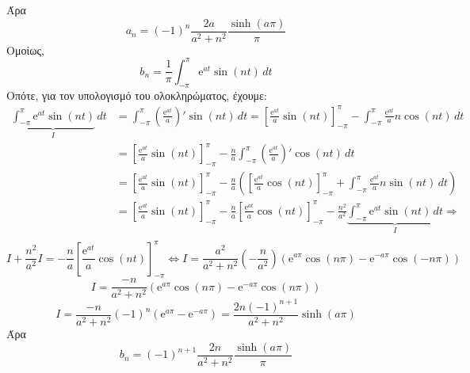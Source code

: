 \begin{solution}
\[  \] 
  Άρα 
  \[
    a_{n} = (-1)^{n}\frac{2a}{a^{2}+n^{2}} \frac{\sinh{(a \pi)}}{\pi}
  \] 
  Ομοίως, 
  \[
    b_{n} = \frac{1}{\pi} \int_{-\pi}^{\pi} \mathrm{e}^{at} \sin{(nt)} \,{dt}
  \]
  Οπότε, για τον υπολογισμό του ολοκληρώματος, έχουμε:
  \begin{align*}
    \underbrace{\int_{-\pi}^{\pi} \mathrm{e}^{at} \sin{(nt)}}_{I} \,{dt} 
    &= \int_{-\pi}^{\pi} \left(\frac{\mathrm{e}^{at}}{a} \right)' \sin{(nt)}\,{dt} 
    = \left[\frac{\mathrm{e}^{at}}{a} \sin{(nt)} 
    \right]_{- \pi }^{\pi} - \int_{-\pi}^{\pi} \frac{\mathrm{e}^{at}}{a} n \cos{(nt)}
    \,{dt} \\
    &= \left[\frac{\mathrm{e}^{at}}{a} \sin{(nt)} 
    \right]_{- \pi }^{\pi} - \frac{n}{a}  \int_{-\pi}^{\pi}
    \left(\frac{\mathrm{e}^{at}}{a}\right)' \cos{(nt)} \,{dt} \\
    &= \left[\frac{\mathrm{e}^{at}}{a} \sin{(nt)} 
    \right]_{- \pi }^{\pi} - \frac{n}{a} 
    \left(\left[\frac{\mathrm{e}^{at}}{a} \cos{(nt)} 
      \right]_{- \pi }^{\pi }+\int_{-\pi}^{\pi} \frac{\mathrm{e}^{at}}{a} n 
    \sin{(nt)} \,{dt}\right) \\ 
    &= \left[\frac{\mathrm{e}^{at}}{a} \sin{(nt)} 
    \right]_{- \pi }^{\pi} - \frac{n}{a} 
    \left[\frac{\mathrm{e}^{at}}{a} \cos{(nt)} 
    \right]_{- \pi }^{\pi }- \frac{n^{2}}{a^{2}}
    \underbrace{\int_{-\pi}^{\pi}
    \mathrm{e}^{at} \sin{(nt)} \,{dt}}_{I} \Rightarrow \\ 
  \end{align*}
  \[
    I+ \frac{n^{2}}{a^{2}} I = - \frac{n}{a} \left[\frac{\mathrm{e}^{at}}{a} \cos{(nt)} 
    \right]_{- \pi }^{\pi} \Leftrightarrow 
    I = \frac{a^{2}}{a^{2}+n^{2}} \left(-\frac{n}{a^{2}}\right)
    \left(\mathrm{e}^{a \pi} \cos{(n \pi)} - \mathrm{e}^{-a \pi} \cos{(-n \pi)}\right)
  \]
  \[
    I = \frac{-n}{a^{2}+n^{2}} \left(\mathrm{e}^{a \pi} \cos{(n \pi)} - \mathrm{e}^{-a \pi} \cos{(n \pi)}\right)
  \] 
  \[
    I = \frac{-n}{a^{2}+n^{2}} (-1)^{n} \left(\mathrm{e}^{a \pi} - 
    \mathrm{e}^{-a \pi}\right) = \frac{2n(-1)^{n+1}}{a^{2}+n^{2}} \sinh{(a \pi)} 
  \] 
  Άρα 
  \[
    b_{n} = (-1)^{n+1}\frac{2n}{a^{2}+n^{2}} \frac{\sinh{(a \pi)}}{\pi}
  \] 
\end{solution}


